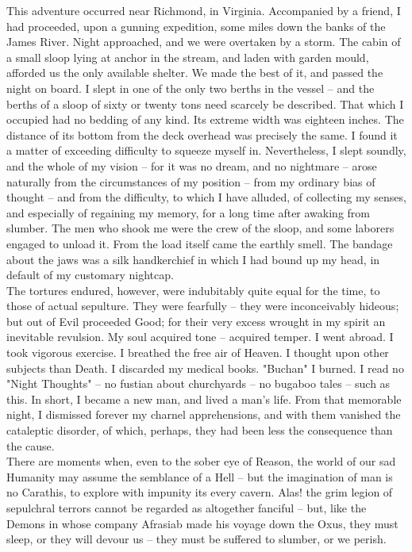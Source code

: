 \documentclass[12pt,a4paper]{article}
\begin{document}
This adventure occurred near Richmond, in Virginia. Accompanied by a friend, I had proceeded, upon a gunning expedition, some miles down the banks of the James River. Night approached, and we were overtaken by a storm. The cabin of a small sloop lying at anchor in the stream, and laden with garden mould, afforded us the only available shelter. We made the best of it, and passed the night on board. I slept in one of the only two berths in the vessel -- and the berths of a sloop of sixty or twenty tons need scarcely be described. That which I occupied had no bedding of any kind. Its extreme width was eighteen inches. The distance of its bottom from the deck overhead was precisely the same. I found it a matter of exceeding difficulty to squeeze myself in. Nevertheless, I slept soundly, and the whole of my vision -- for it was no dream, and no nightmare -- arose naturally from the circumstances of my position -- from my ordinary bias of thought -- and from the difficulty, to which I have alluded, of collecting my senses, and especially of regaining my memory, for a long time after awaking from slumber. The men who shook me were the crew of the sloop, and some laborers engaged to unload it. From the load itself came the earthly smell. The bandage about the jaws was a silk handkerchief in which I had bound up my head, in default of my customary nightcap. \\

The tortures endured, however, were indubitably quite equal for the time, to those of actual sepulture. They were fearfully -- they were inconceivably hideous; but out of Evil proceeded Good; for their very excess wrought in my spirit an inevitable revulsion. My soul acquired tone -- acquired temper. I went abroad. I took vigorous exercise. I breathed the free air of Heaven. I thought upon other subjects than Death. I discarded my medical books. "Buchan" I burned. I read no "Night Thoughts" -- no fustian about churchyards -- no bugaboo tales -- such as this. In short, I became a new man, and lived a man's life. From that memorable night, I dismissed forever my charnel apprehensions, and with them vanished the cataleptic disorder, of which, perhaps, they had been less the consequence than the cause. \\

There are moments when, even to the sober eye of Reason, the world of our sad Humanity may assume the semblance of a Hell -- but the imagination of man is no Carathis, to explore with impunity its every cavern. Alas! the grim legion of sepulchral terrors cannot be regarded as altogether fanciful -- but, like the Demons in whose company Afrasiab made his voyage down the Oxus, they must sleep, or they will devour us -- they must be suffered to slumber, or we perish. \\
\end{document}
